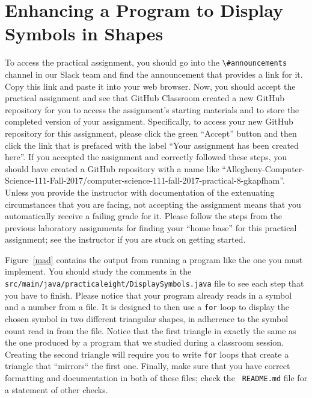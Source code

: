 \documentclass[11pt]{article}
\newcommand{\mainprogramsource}{\lstinline{src/main/java/practicaleight/DisplaySymbols.java}}
\newcommand{\program}[1]{\lstinline{#1}}
\newcommand{\channel}[1]{\lstinline{#1}}
\begin{document}
\section*{Enhancing a Program to Display Symbols in Shapes}

To access the practical assignment, you should go into the \channel{\#announcements} channel in our Slack team and find
the announcement that provides a link for it. Copy this link and paste it into your web browser. Now, you should accept
the practical assignment and see that GitHub Classroom created a new GitHub repository for you to access the
assignment's starting materials and to store the completed version of your assignment. Specifically, to access your new
GitHub repository for this assignment, please click the green ``Accept'' button and then click the link that is prefaced
with the label ``Your assignment has been created here''. If you accepted the assignment and correctly followed these
steps, you should have created a GitHub repository with a name like
``Allegheny-Computer-Science-111-Fall-2017/computer-science-111-fall-2017-practical-8-gkapfham''. Unless you provide the
instructor with documentation of the extenuating circumstances that you are facing, not accepting the assignment means
that you automatically receive a failing grade for it. Please follow the steps from the previous laboratory assignments
for finding your ``home base'' for this practical assignment; see the instructor if you are stuck on getting started.

Figure~\ref{mad} contains the output from running a program like the one you must implement. You should study the
comments in the \mainprogramsource{} file to see each step that you have to finish. Please notice that your program
already reads in a symbol and a number from a file. It is designed to then use a \program{for} loop to display the
chosen symbol in two different triangular shapes, in adherence to the symbol count read in from the file. Notice that
the first triangle in exactly the same as the one produced by a program that we studied during a classroom session.
Creating the second triangle will require you to write \program{for} loops that create a triangle that ``mirrors`` the
first one. Finally, make sure that you have correct formatting and documentation in both of these files; check the {\tt
README.md} file for a statement of other checks.
\end{document}
